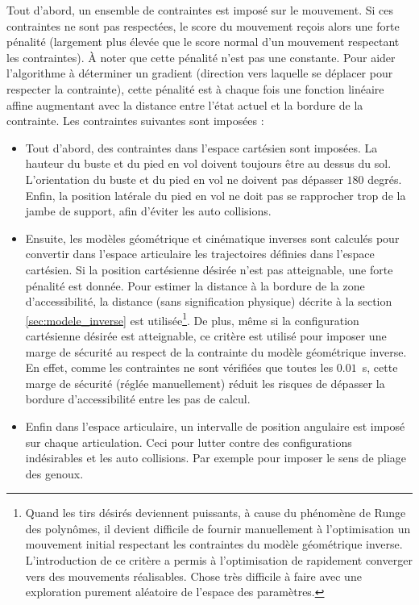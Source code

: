 Tout d'abord, un ensemble de contraintes est imposé sur le mouvement.
Si ces contraintes ne sont pas respectées, le score du mouvement reçois
alors une forte pénalité (largement plus élevée que le score normal 
d'un mouvement respectant les contraintes).
À noter que cette pénalité n'est pas une constante. 
Pour aider l'algorithme à déterminer un gradient (direction vers laquelle se déplacer pour 
respecter la contrainte), cette pénalité est à chaque fois une fonction linéaire affine augmentant
avec la distance entre l'état actuel et la bordure de la contrainte.
Les contraintes suivantes sont imposées :
\begin{itemize}
    \item Tout d'abord, des contraintes dans l'espace cartésien sont imposées.
        La hauteur du buste et du pied en vol doivent toujours être au dessus du sol.
        L'orientation du buste et du pied en vol ne doivent pas dépasser $180$ degrés.
        Enfin, la position latérale du pied en vol ne doit pas se rapprocher trop
        de la jambe de support, afin d'éviter les auto collisions.
    \item Ensuite, les modèles géométrique et cinématique inverses sont calculés
        pour convertir dans l'espace articulaire les trajectoires définies 
        dans l'espace cartésien.
        Si la position cartésienne désirée n'est pas atteignable, 
        une forte pénalité est donnée.
        Pour estimer la distance à la bordure de la zone d'accessibilité, la
        \og distance \fg (sans signification physique) décrite à la section
        \ref{sec:modele_inverse} est utilisée\footnote{
            Quand les tirs désirés deviennent puissants, à cause du phénomène 
            de Runge des polynômes,
            il devient difficile de fournir manuellement à l'optimisation 
            un mouvement initial respectant les contraintes du modèle 
            géométrique inverse.
            L'introduction de ce critère a permis à l'optimisation de rapidement
            converger vers des mouvements réalisables. Chose très difficile
            à faire avec une exploration purement aléatoire de l'espace des paramètres.
        }.
        De plus, même si la configuration cartésienne désirée est atteignable,
        ce critère est utilisé pour imposer une marge de sécurité au respect de
        la contrainte du modèle géométrique inverse.
        En effet, comme les contraintes ne sont vérifiées que toutes les $0.01$~s,
        cette marge de sécurité (réglée manuellement) réduit les risques
        de dépasser la bordure d'accessibilité entre les pas de calcul.
    \item Enfin dans l'espace articulaire, un intervalle de position angulaire 
        est imposé sur chaque articulation.
        Ceci pour lutter contre des configurations indésirables et les auto collisions.
        Par exemple pour imposer le sens de pliage des genoux.
\end{itemize}
